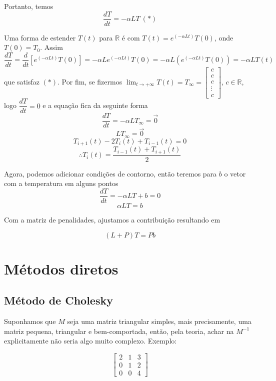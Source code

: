 \documentclass{article}
\begin{document}
    Portanto, temos
    \[\frac{dT}{dt} = -\alpha LT\ (*)\]
    
    Uma forma de estender $T(t)$ para $\mathbb{R}$ é com $T(t) = e^{(-\alpha Lt)}T(0)$, onde $T(0) = T_0$. Assim
    \[\frac{dT}{dt} = \frac{d}{dt}[e^{(-\alpha Lt)}T(0)] = -\alpha L e^{(-\alpha Lt)}T(0) = -\alpha L (e^{(-\alpha Lt)}T(0)) = -\alpha L T(t)\]
    que satisfaz $(*)$. Por fim, se fizermos $\displaystyle{ \lim_{t \to +\infty} T(t) = T_\infty = \left[ \begin{array}{c}
        c\\
        c\\
        c\\
        \vdots\\
        c
    \end{array} \right] }$, $c \in \mathbb{R}$, logo $\dfrac{dT}{dt} = 0$ e a equação fica da seguinte forma
    \[\frac{dT}{dt} = -\alpha LT_\infty = \vec{0}\]
    \[LT_\infty = \vec{0}\]
    \[T_{i+1}(t)-2T_i(t)+T_{i-1}(t) = 0\]
    \[\therefore T_i(t) = \frac{T_{i-1}(t)+T_{i+1}(t)}{2}\]

    Agora, podemos adicionar condições de contorno, então teremos para $b$ o vetor com a temperatura em alguns pontos 
    \[\frac{dT}{dt} = -\alpha LT + b = 0\]
    \[\alpha LT = b\]

    Com a matriz de penalidades, ajustamos a contribuição resultando em

    \[(L+P)T = Pb\]

    \newpage

    \section{Métodos diretos}

    \subsection{Método de Cholesky}

    Suponhamos que $M$ seja uma matriz triangular simples, mais precisamente, uma matriz pequena, triangular e bem-comportada, então, pela teoria, achar na $M^{-1}$ explicitamente não seria algo muito complexo. Exemplo:

    \[
    \begin{bmatrix}
    2 & 1 & 3 \\
    0 & 1 & 2 \\
    0 & 0 & 4
    \end{bmatrix}
    \]
\end{document}
